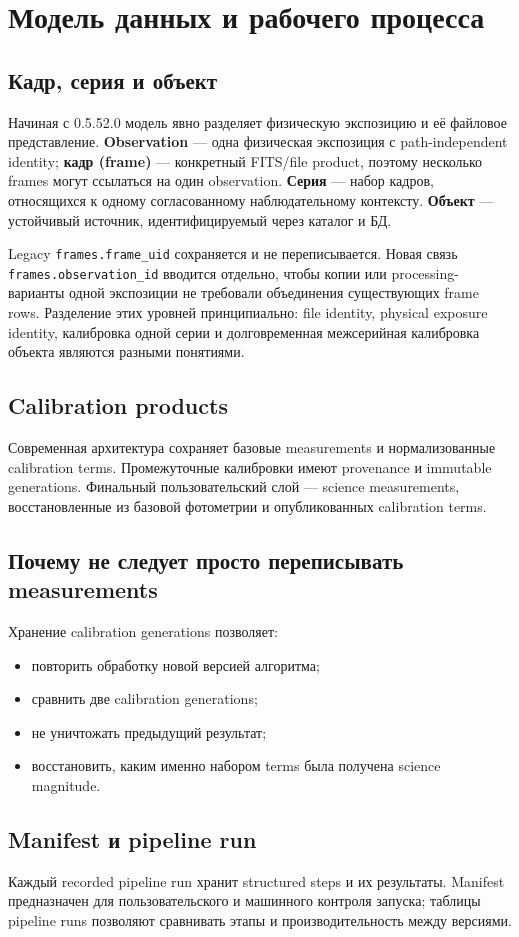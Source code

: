 \chapter{Модель данных и рабочего процесса}

\section{Кадр, серия и объект}

Начиная с 0.5.52.0 модель явно разделяет физическую экспозицию и её файловое представление. \textbf{Observation} --- одна физическая экспозиция с path-independent identity; \textbf{кадр (frame)} --- конкретный FITS/file product, поэтому несколько frames могут ссылаться на один observation. \textbf{Серия} --- набор кадров, относящихся к одному согласованному наблюдательному контексту. \textbf{Объект} --- устойчивый источник, идентифицируемый через каталог и БД.

Legacy \texttt{frames.frame\_uid} сохраняется и не переписывается. Новая связь \texttt{frames.observation\_id} вводится отдельно, чтобы копии или processing-варианты одной экспозиции не требовали объединения существующих frame rows. Разделение этих уровней принципиально: file identity, physical exposure identity, калибровка одной серии и долговременная межсерийная калибровка объекта являются разными понятиями.

\section{Calibration products}

Современная архитектура сохраняет базовые measurements и нормализованные calibration terms. Промежуточные калибровки имеют provenance и immutable generations. Финальный пользовательский слой --- science measurements, восстановленные из базовой фотометрии и опубликованных calibration terms.

\section{Почему не следует просто переписывать measurements}

Хранение calibration generations позволяет:

\begin{itemize}
  \item повторить обработку новой версией алгоритма;
  \item сравнить две calibration generations;
  \item не уничтожать предыдущий результат;
  \item восстановить, каким именно набором terms была получена science magnitude.
\end{itemize}

\section{Manifest и pipeline run}

Каждый recorded pipeline run хранит structured steps и их результаты. Manifest предназначен для пользовательского и машинного контроля запуска; таблицы pipeline runs позволяют сравнивать этапы и производительность между версиями.
